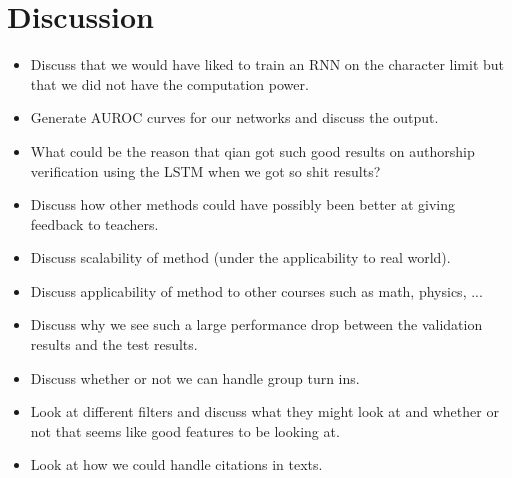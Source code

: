 \section{Discussion} \label{sec:discussion}

\begin{itemize}

    \item

        Discuss that we would have liked to train an RNN on the character limit
        but that we did not have the computation power.

    \item

        Generate AUROC curves for our networks and discuss the output.

    \item

        What could be the reason that qian got such good results on authorship
        verification using the LSTM when we got so shit results?

    \item

        Discuss how other methods could have possibly been better at giving
        feedback to teachers.

    \item

        Discuss scalability of method (under the applicability to real world).

    \item

        Discuss applicability of method to other courses such as math, physics,
        ...

    \item

        Discuss why we see such a large performance drop between the validation
        results and the test results.

    \item

        Discuss whether or not we can handle group turn ins.

    \item

        Look at different filters and discuss what they might look at and
        whether or not that seems like good features to be looking at.

    \item

        Look at how we could handle citations in texts.

\end{itemize}



